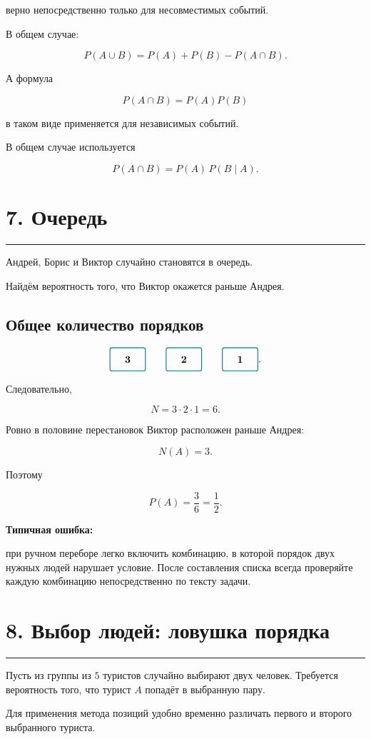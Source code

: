\documentclass[a4paper,12pt]{article}
\newcommand{\sectionline}{%
    \vspace{0.2em}
    {\color{accent}\rule{\linewidth}{0.7pt}}
    \vspace{0.4em}
}
\newcommand{\positionbox}[1]{%
    \tikz[baseline=-0.7ex]\node[
        draw=accent,
        rounded corners=2pt,
        minimum width=1.25cm,
        minimum height=0.8cm,
        line width=0.8pt
    ]{\textbf{#1}};%
}
\newcommand{\important}[1]{%
    \par\smallskip
    {\color{darkaccent}\textbf{#1}}
    \par\smallskip
}
\begin{document}
верно непосредственно только для несовместимых событий.

В общем случае:

\[
\boxed{
P(A\cup B)=P(A)+P(B)-P(A\cap B)
}.
\]

А формула

\[
P(A\cap B)=P(A)P(B)
\]

в таком виде применяется для независимых событий.

В общем случае используется

\[
\boxed{
P(A\cap B)=P(A)\,P(B\mid A)
}.
\]

\section*{7. Очередь}
\sectionline

Андрей, Борис и Виктор случайно становятся в очередь.

Найдём вероятность того, что Виктор окажется раньше Андрея.

\subsection*{Общее количество порядков}

\[
\positionbox{3}
\qquad
\positionbox{2}
\qquad
\positionbox{1}.
\]

Следовательно,

\[
N=3\cdot2\cdot1=6.
\]

Ровно в половине перестановок Виктор расположен раньше Андрея:

\[
N(A)=3.
\]

Поэтому

\[
\boxed{
P(A)=\frac36=\frac12
}.
\]

\important{Типичная ошибка:}
при ручном переборе легко включить комбинацию, в которой порядок двух нужных людей нарушает условие. После составления списка всегда проверяйте каждую комбинацию непосредственно по тексту задачи.

\section*{8. Выбор людей: ловушка порядка}
\sectionline

Пусть из группы из \(5\) туристов случайно выбирают двух человек. Требуется вероятность того, что турист \(A\) попадёт в выбранную пару.

Для применения метода позиций удобно временно различать первого и второго выбранного туриста.
\end{document}
